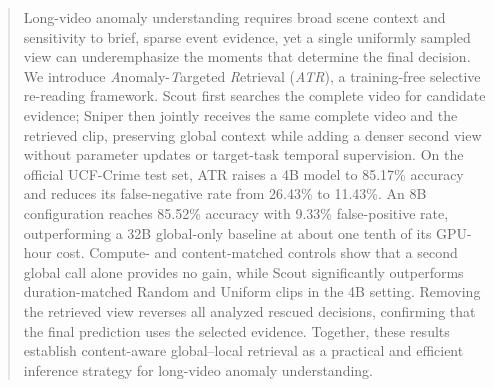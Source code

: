 \begin{abstract}
Long-video anomaly understanding requires broad scene context and sensitivity to brief, sparse event evidence, yet a single uniformly sampled view can underemphasize the moments that determine the final decision.
We introduce \textit{A}nomaly-\textit{T}argeted \textit{R}etrieval (\textit{ATR}), a training-free selective re-reading framework.
Scout first searches the complete video for candidate evidence; Sniper then jointly receives the same complete video and the retrieved clip, preserving global context while adding a denser second view without parameter updates or target-task temporal supervision.
On the official UCF-Crime test set, ATR raises a 4B model to 85.17\% accuracy and reduces its false-negative rate from 26.43\% to 11.43\%.
An 8B configuration reaches 85.52\% accuracy with 9.33\% false-positive rate, outperforming a 32B global-only baseline at about one tenth of its GPU-hour cost.
Compute- and content-matched controls show that a second global call alone provides no gain, while Scout significantly outperforms duration-matched Random and Uniform clips in the 4B setting.
Removing the retrieved view reverses all analyzed rescued decisions, confirming that the final prediction uses the selected evidence.
Together, these results establish content-aware global--local retrieval as a practical and efficient inference strategy for long-video anomaly understanding.
\end{abstract}
    
